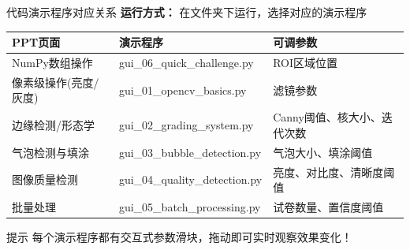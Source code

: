 \documentclass[aspectratio=169, 12pt]{beamer}
\begin{document}
\begin{frame}{代码演示程序对应关系}
    \textbf{运行方式：} 在文件夹下运行，选择对应的演示程序

    \vspace{0.3cm}

    \begin{table}
        \centering
        \small
        \begin{tabular}{lp{5cm}l}
            \toprule
            \textbf{PPT页面} & \textbf{演示程序} & \textbf{可调参数} \\
            \midrule
            NumPy数组操作 & gui\_06\_quick\_challenge.py & ROI区域位置 \\
            像素级操作(亮度/灰度) & gui\_01\_opencv\_basics.py & 滤镜参数 \\
            边缘检测/形态学 & gui\_02\_grading\_system.py & Canny阈值、核大小、迭代次数 \\
            气泡检测与填涂 & gui\_03\_bubble\_detection.py & 气泡大小、填涂阈值 \\
            图像质量检测 & gui\_04\_quality\_detection.py & 亮度、对比度、清晰度阈值 \\
            批量处理 & gui\_05\_batch\_processing.py & 试卷数量、置信度阈值 \\
            \bottomrule
        \end{tabular}
    \end{table}

    \vspace{0.3cm}

    \begin{alertblock}{提示}
        每个演示程序都有交互式参数滑块，拖动即可实时观察效果变化！
    \end{alertblock}
\end{frame}
\end{document}
